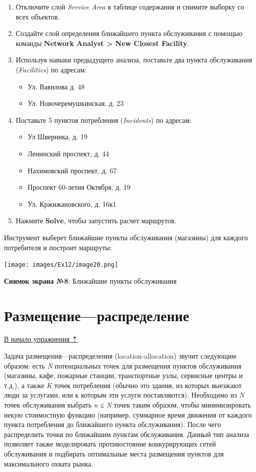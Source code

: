 \documentclass[12pt,]{book}
\providecommand{\tightlist}{%
  \setlength{\itemsep}{0pt}\setlength{\parskip}{0pt}}
\begin{document}
\begin{enumerate}
\def\labelenumi{\arabic{enumi}.}
\item
  Отключите слой \emph{Service Area} в таблице содержания и снимите выборку со всех объектов.
\item
  Создайте слой определения ближайшего пункта обслуживания с помощью команды \textbf{Network Analyst \textgreater{} New Closest Facility}.
\item
  Используя навыки предыдущего анализа, поставьте два пункта обслуживания (\emph{Facilities}) по адресам:

  \begin{itemize}
  \tightlist
  \item
    Ул. Вавилова д. 48
  \item
    Ул. Новочеремушкинская, д. 23
  \end{itemize}
\item
  Поставьте 5 пунктов потребления (\emph{Incidents}) по адресам:

  \begin{itemize}
  \item
    Ул Шверника, д. 19
  \item
    Ленинский проспект, д. 44
  \item
    Нахимовский проспект, д. 67
  \item
    Проспект 60-летия Октября, д. 19
  \item
    Ул. Кржижановского, д. 16к1
  \end{itemize}
\item
  Нажмите \textbf{Solve}, чтобы запустить расчет маршрутов.
\end{enumerate}

Инструмент выберет ближайшие пункты обслуживания (магазины) для каждого потребителя и построит маршруты:

\texttt{[image: images/Ex12/image20.png]}

\textbf{Снимок экрана №8}. Ближайшие пункты обслуживания

\hypertarget{network-analysis-allocation}{%
\section{Размещение---распределение}\label{network-analysis-allocation}}

\protect\hyperlink{network-analysis}{В начало упражнения ⇡}

Задача размещения---распределения (location-allocation) звучит следующим образом: есть \emph{N} потенциальных точек для размещения пунктов обслуживания (магазины, кафе, пожарные станции, транспортные узлы, сервисные центры и т.д.), а также \emph{K} точек потребления (обычно это здания, из которых выезжают люди за услугами, или к которым эти услуги поставляются). Необходимо из \emph{N} точек обслуживания выбрать \emph{n} ≤ \emph{N} точек таким образом, чтобы минимизировать некую стоимостную функцию (например, суммарное время движения от каждого пункта потребления до ближайшего пункта обслуживания). После чего распределить точки по ближайшим пунктам обслуживания. Данный тип анализа позволяет также моделировать противостояние конкурирующих сетей обслуживания и подбирать оптимальные места размещения пунктов для максимального охвата рынка.
\end{document}
